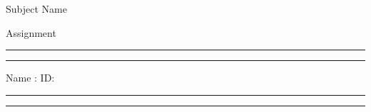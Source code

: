 \begin{center}
    {
    \fontsize{20pt}{30pt}\selectfont
    Subject Name
    \par
    Assignment
    \vspace*{.5cm}
    }
\end{center}
\hrule
\vspace*{.1cm}
\hrule
Name :  \hspace*{9cm} ID: 
\\
\hrule
\vspace*{.1cm}
\hrule